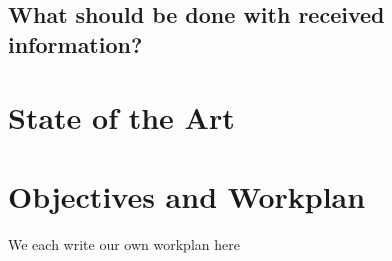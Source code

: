 \documentclass{article}
\begin{document}
%
%
%
%

\subsection{What  should be done with received information?}

\section{State of the Art}
\section{Objectives and Workplan}
We each write our own workplan here



\end{document}
